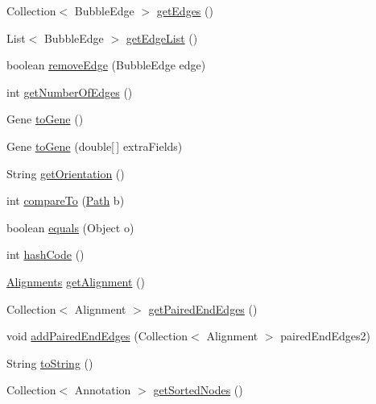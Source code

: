 \begin{DoxyCompactItemize}
\item 
Collection$<$ Bubble\+Edge $>$ \hyperlink{classbroad_1_1pda_1_1seq_1_1graph_1_1_path_abd24e986520eea6377aee5fde8ed85a3}{get\+Edges} ()
\item 
List$<$ Bubble\+Edge $>$ \hyperlink{classbroad_1_1pda_1_1seq_1_1graph_1_1_path_a835abd712872e0c724d0a1fd0cf35582}{get\+Edge\+List} ()
\item 
boolean \hyperlink{classbroad_1_1pda_1_1seq_1_1graph_1_1_path_a3766a13bd5bd98bdd91016dd29759745}{remove\+Edge} (Bubble\+Edge edge)
\item 
int \hyperlink{classbroad_1_1pda_1_1seq_1_1graph_1_1_path_ab96f69a0d2cd728894d59a7b0b757efc}{get\+Number\+Of\+Edges} ()
\item 
Gene \hyperlink{classbroad_1_1pda_1_1seq_1_1graph_1_1_path_adcca168a9ae64adbf669aefd26452634}{to\+Gene} ()
\item 
Gene \hyperlink{classbroad_1_1pda_1_1seq_1_1graph_1_1_path_aeffa78d58b14075c327d51849735b804}{to\+Gene} (double\mbox{[}$\,$\mbox{]} extra\+Fields)
\item 
String \hyperlink{classbroad_1_1pda_1_1seq_1_1graph_1_1_path_ac58d8ef7f61e00ae2ee627c67c645595}{get\+Orientation} ()
\item 
int \hyperlink{classbroad_1_1pda_1_1seq_1_1graph_1_1_path_a70cb4c85f8d4cacee312306bee79508d}{compare\+To} (\hyperlink{classbroad_1_1pda_1_1seq_1_1graph_1_1_path}{Path} b)
\item 
boolean \hyperlink{classbroad_1_1pda_1_1seq_1_1graph_1_1_path_a5b2c4a07f48cacdc599daa45848f3ed6}{equals} (Object o)
\item 
int \hyperlink{classbroad_1_1pda_1_1seq_1_1graph_1_1_path_af21ea805243e66d4ae02994709a588e2}{hash\+Code} ()
\item 
\hyperlink{classbroad_1_1pda_1_1datastructures_1_1_alignments}{Alignments} \hyperlink{classbroad_1_1pda_1_1seq_1_1graph_1_1_path_a6cf246f0e21368221a8bff05ff4d0412}{get\+Alignment} ()
\item 
Collection$<$ Alignment $>$ \hyperlink{classbroad_1_1pda_1_1seq_1_1graph_1_1_path_a0f08036276af74a69d99ba13a0a55a84}{get\+Paired\+End\+Edges} ()
\item 
void \hyperlink{classbroad_1_1pda_1_1seq_1_1graph_1_1_path_a48655e836e5f9370eb58079a4947ead8}{add\+Paired\+End\+Edges} (Collection$<$ Alignment $>$ paired\+End\+Edges2)
\item 
String \hyperlink{classbroad_1_1pda_1_1seq_1_1graph_1_1_path_ada5eccda56ab5aa95e499d52eaba6f18}{to\+String} ()
\item 
Collection$<$ Annotation $>$ \hyperlink{classbroad_1_1pda_1_1seq_1_1graph_1_1_path_ae5c86ade2b8e8d09a6ed6bbe1a4791f0}{get\+Sorted\+Nodes} ()

\end{DoxyCompactItemize}
